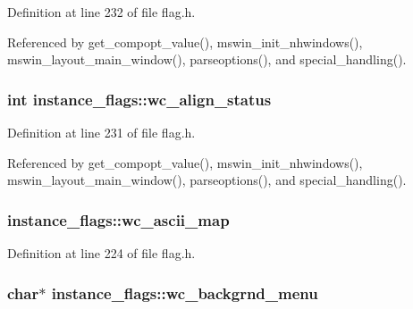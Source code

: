Definition at line 232 of file flag.\+h.



Referenced by get\+\_\+compopt\+\_\+value(), mswin\+\_\+init\+\_\+nhwindows(), mswin\+\_\+layout\+\_\+main\+\_\+window(), parseoptions(), and special\+\_\+handling().

\hypertarget{structinstance__flags_a59e71b710998b8e0a611d775cee0dded}{
\subsubsection[{wc\+\_\+align\+\_\+status}]{\setlength{\rightskip}{0pt plus 5cm}int instance\+\_\+flags\+::wc\+\_\+align\+\_\+status}}\label{structinstance__flags_a59e71b710998b8e0a611d775cee0dded}


Definition at line 231 of file flag.\+h.



Referenced by get\+\_\+compopt\+\_\+value(), mswin\+\_\+init\+\_\+nhwindows(), mswin\+\_\+layout\+\_\+main\+\_\+window(), parseoptions(), and special\+\_\+handling().

\hypertarget{structinstance__flags_ad60b6d9c7325933b6d23044bd9a93b2e}{
\subsubsection[{wc\+\_\+ascii\+\_\+map}]{ instance\+\_\+flags\+::wc\+\_\+ascii\+\_\+map}}\label{structinstance__flags_ad60b6d9c7325933b6d23044bd9a93b2e}


Definition at line 224 of file flag.\+h.

\hypertarget{structinstance__flags_ae5094152d080f61309e0bd0bf663fa46}{
\subsubsection[{wc\+\_\+backgrnd\+\_\+menu}]{\setlength{\rightskip}{0pt plus 5cm}char$\ast$ instance\+\_\+flags\+::wc\+\_\+backgrnd\+\_\+menu}}\label{structinstance__flags_ae5094152d080f61309e0bd0bf663fa46}


